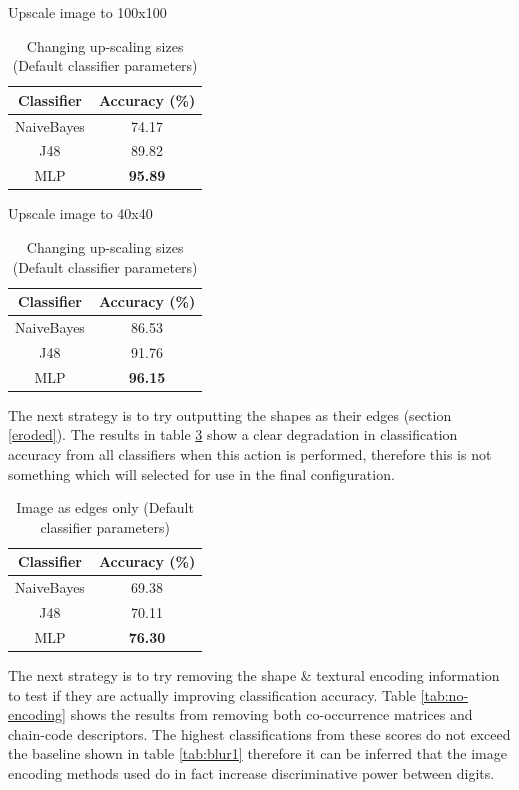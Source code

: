 \documentclass[12pt]{article}
\begin{document}
    \begin{table}[H]
      \begin{subtable}{.5\linewidth}
        \centering
        \caption{Upscale image to 100x100}
        \begin{tabular}{c|c}
          \toprule
          \multicolumn{1}{c|}{Classifier} & \multicolumn{1}{c}{Accuracy (\%)} \\
          \midrule
          NaiveBayes & 74.17 \\
          J48   & 89.82 \\
          MLP   & \textbf{95.89} \\
          \bottomrule
        \end{tabular}%
        \label{tab:upscale-100}%
      \end{subtable}
      \begin{subtable}{.5\linewidth}
        \centering
        \caption{Upscale image to 40x40}
        \begin{tabular}{c|c}
        \toprule
        Classifier & Accuracy (\%) \\
        \midrule
        NaiveBayes & 86.53 \\
        J48   & 91.76 \\
        MLP   & \textbf{96.15} \\
        \bottomrule
        \end{tabular}%
        \label{tab:upscale-40}%
      \end{subtable}
      \caption{Changing up-scaling sizes (Default classifier parameters)}
      \label{tab:upscale}
    \end{table}
    The next strategy is to try outputting the shapes as their edges (section \ref{eroded}). The results in table \ref{tab:edges-only} show a clear degradation in classification accuracy from all classifiers when this action is performed, therefore this is not something which will selected for use in the final configuration.

    \begin{table}[H]
      \centering
      \begin{tabular}{c|c}
        \toprule
        Classifier & Accuracy (\%) \\
        \midrule
        NaiveBayes & 69.38 \\
        J48   & 70.11 \\
        MLP   & \textbf{76.30} \\
        \bottomrule
      \end{tabular}%
      \caption{Image as edges only (Default classifier parameters)}
      \label{tab:edges-only}%
    \end{table}%
    The next strategy is to try removing the shape \& textural encoding information to test if they are actually improving classification accuracy. Table \ref{tab:no-encoding} shows the results from removing both co-occurrence matrices and chain-code descriptors. The highest classifications from these scores do not exceed the baseline shown in table \ref{tab:blur1} therefore it can be inferred that the image encoding methods used do in fact increase discriminative power between digits.
\end{document}
